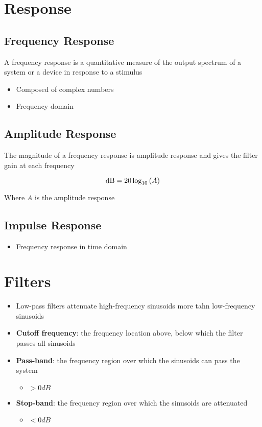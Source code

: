 \section{Response}

  \subsection{Frequency Response}

    A frequency response is a quantitative measure of the output spectrum
    of a system or a device in response to a stimulus

    \begin{itemize}
      \item Composed of complex numbers
      \item Frequency domain
    \end{itemize}

  \subsection{Amplitude Response}

    The magnitude of a frequency response is amplitude response and gives
    the filter gain at each frequency

    \begin{equation}
      \operatorname{dB} = 20 \log_{10} \left( A \right)
    \end{equation}

    Where $ A $ is the amplitude response

  \subsection{Impulse Response}

    \begin{itemize}
      \item Frequency response in time domain
    \end{itemize}

\section{Filters}

  \begin{itemize}
    \item Low-pass filters attenuate high-frequency sinusoids more tahn
    low-frequency sinusoids
    \item \textbf{Cutoff frequency}: the frequency location above, below which
    the filter passes all sinusoids
    \item \textbf{Pass-band}: the frequency region over which the
    sinusoids can pass the system
    \begin{itemize}
      \item $ > 0 dB $
    \end{itemize}
    \item \textbf{Stop-band}: the frequency region over which the
    sinusoids are attenuated
    \begin{itemize}
      \item $ < 0 dB $
    \end{itemize}
  \end{itemize}

